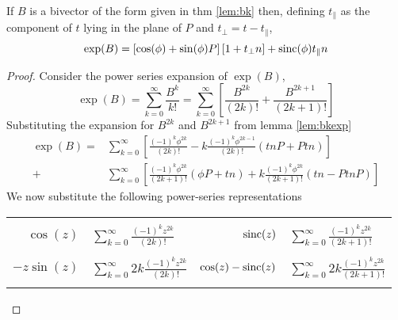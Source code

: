 \begin{thm}
\label{lem:exp}
If $B$ is a bivector of the form given in thm \ref{lem:bk}
then, defining 
$t_\parallel$ as the component of $t$ lying in the plane of $P$ 
and $t_\perp = t - t_\parallel$,
\[
\exp(B) = \left[ \cos(\phi) + \sin(\phi) P \right] \left[ 1 + t_\perp n \right] + \mathrm{sinc}(\phi) t_\parallel n
\]
\end{thm}
\begin{proof}
Consider the power series expansion of $\exp (B)$,
\[
\exp (B)=\sum _{k=0}^{\infty }\frac{B^{k}}{k!}=\sum _{k=0}^{\infty }\left[\frac{B^{2k}}{(2k)!}+\frac{B^{2k+1}}{(2k+1)!}\right]\]
Substituting the expansion for $B^{2k}$ and $B^{2k+1}$ from 
lemma \ref{lem:bkexp}
\begin{align*}
\exp (B)= & \sum _{k=0}^{\infty }\left[
 \frac{
   (-1)^k\phi^{2k}
 }{(2k)!} - k \frac{
   (-1)^k\phi^{2k-1}
 }{(2k)!} \left(tnP + Ptn\right)
\right]\\
+ & \sum _{k=0}^{\infty }\left[
 \frac{
   (-1)^k\phi^{2k}
 }{(2k+1)!} \left(\phi P + tn\right) + 
 k\frac{
   (-1)^k \phi^{2k}
 }{(2k+1)!} \left( tn - PtnP \right)\right]
\end{align*}
We now substitute the following power-series representations

\begin{centering}


\begin{tabular}{r@{$\ =\ $}l@{$\quad$}r@{$\ = \ $}l}
\multicolumn{4}{l}{\vspace{0.1cm}} \\
$\cos(z)$ & $\sum_{k=0}^\infty \frac{(-1)^k z^{2k}}{(2k)!}$ &
$\mathrm{sinc}(z)$ & $\sum_{k=0}^\infty \frac{(-1)^k z^{2k}}{(2k+1)!}$ \\
\multicolumn{4}{l}{\vspace{0.1cm}} \\
$- z \sin(z)$ & $\sum_{k=0}^\infty 2k \frac{(-1)^k z^{2k}}{(2k)!}$ &
$\cos(z) - \mathrm{sinc}(z)$ & $\sum_{k=0}^\infty 2k \frac{(-1)^k z^{2k}}{(2k+1)!}$ \\
\multicolumn{4}{l}{\vspace{0.1cm}} \\
\end{tabular}


\end{centering}
\end{proof}
